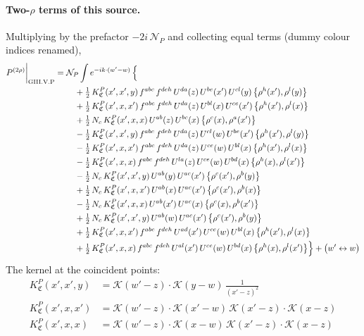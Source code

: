 \documentclass[10pt]{article}
\numberwithin{equation}{section}
\newcommand{\KK}{\mathcal K}
\newcommand{\NP}{\mathcal N_{P}}
\begin{document}
\paragraph{Two-$\rho$ terms of this source.} Multiplying by the prefactor $-2i\,\NP$ and collecting equal terms (dummy colour indices renamed),
\begin{align}
P^{(2\rho)}\bigg|_{\rm GIII.V.P}={}&\NP\int e^{-ik\cdot(w'-w)}\,\Big\{\notag\\
&\quad +\tfrac12\,K^{P}_{\mathfrak C}(x',x',y)\,f^{abc}\,f^{deh}\,U^{da}(z)\,U^{be}(x')\,U^{cl}(y)\,\big\{\rho^{h}(x'),\rho^{l}(y)\big\}\notag\\
&\quad +\tfrac12\,K^{P}_{\mathfrak C}(x',x,x')\,f^{abc}\,f^{deh}\,U^{da}(z)\,U^{bl}(x)\,U^{ce}(x')\,\big\{\rho^{h}(x'),\rho^{l}(x)\big\}\notag\\
&\quad +\tfrac12\,N_{c}\,K^{P}_{\mathfrak C}(x',x,x)\,U^{ab}(z)\,U^{bc}(x)\,\big\{\rho^{c}(x),\rho^{a}(x')\big\}\notag\\
&\quad -\tfrac12\,K^{P}_{\mathfrak C}(x',x',y)\,f^{abc}\,f^{deh}\,U^{da}(z)\,U^{cl}(w)\,U^{be}(x')\,\big\{\rho^{h}(x'),\rho^{l}(y)\big\}\notag\\
&\quad -\tfrac12\,K^{P}_{\mathfrak C}(x',x,x')\,f^{abc}\,f^{deh}\,U^{da}(z)\,U^{ce}(w)\,U^{bl}(x)\,\big\{\rho^{h}(x'),\rho^{l}(x)\big\}\notag\\
&\quad -\tfrac12\,K^{P}_{\mathfrak C}(x',x,x)\,f^{abc}\,f^{deh}\,U^{la}(z)\,U^{ce}(w)\,U^{bd}(x)\,\big\{\rho^{h}(x),\rho^{l}(x')\big\}\notag\\
&\quad -\tfrac12\,N_{c}\,K^{P}_{\mathfrak C}(x',x',y)\,U^{ab}(y)\,U^{ac}(x')\,\big\{\rho^{c}(x'),\rho^{b}(y)\big\}\notag\\
&\quad +\tfrac12\,N_{c}\,K^{P}_{\mathfrak C}(x',x,x')\,U^{ab}(x)\,U^{ac}(x')\,\big\{\rho^{c}(x'),\rho^{b}(x)\big\}\notag\\
&\quad -\tfrac12\,N_{c}\,K^{P}_{\mathfrak C}(x',x,x)\,U^{ab}(x')\,U^{ac}(x)\,\big\{\rho^{c}(x),\rho^{b}(x')\big\}\notag\\
&\quad +\tfrac12\,N_{c}\,K^{P}_{\mathfrak C}(x',x',y)\,U^{ab}(w)\,U^{ac}(x')\,\big\{\rho^{c}(x'),\rho^{b}(y)\big\}\notag\\
&\quad +\tfrac12\,K^{P}_{\mathfrak C}(x',x,x')\,f^{abc}\,f^{deh}\,U^{ad}(x')\,U^{ce}(w)\,U^{bl}(x)\,\big\{\rho^{h}(x'),\rho^{l}(x)\big\}\notag\\
&\quad +\tfrac12\,K^{P}_{\mathfrak C}(x',x,x)\,f^{abc}\,f^{deh}\,U^{al}(x')\,U^{ce}(w)\,U^{bd}(x)\,\big\{\rho^{h}(x),\rho^{l}(x')\big\}\Big\}+\big(w'\leftrightarrow w\big)\label{B:eq:res-GIII.V.P}
\end{align}
The kernel at the coincident points:
\begin{align*}
K^{P}_{\mathfrak C}(x',x',y)&=\KK(w'-z)\cdot\KK(y-w)\,\frac{1}{(x'-z)^2}\\K^{P}_{\mathfrak C}(x',x,x')&=\KK(w'-z)\cdot\KK(x'-w)\,\KK(x'-z)\cdot\KK(x-z)\\K^{P}_{\mathfrak C}(x',x,x)&=\KK(w'-z)\cdot\KK(x-w)\,\KK(x'-z)\cdot\KK(x-z)
\end{align*}
\end{document}
